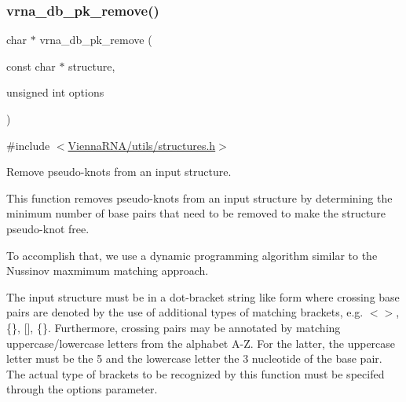 \subsubsection{\texorpdfstring{vrna\_db\_pk\_remove()}{vrna\_db\_pk\_remove()}}
{\footnotesize\ttfamily char $\ast$ vrna\+\_\+db\+\_\+pk\+\_\+remove (\begin{DoxyParamCaption}\item[{const char $\ast$}]{structure,  }\item[{unsigned int}]{options }\end{DoxyParamCaption})}



{\ttfamily \#include $<$\mbox{\hyperlink{utils_2structures_8h}{Vienna\+R\+N\+A/utils/structures.\+h}}$>$}



Remove pseudo-\/knots from an input structure. 

This function removes pseudo-\/knots from an input structure by determining the minimum number of base pairs that need to be removed to make the structure pseudo-\/knot free.

To accomplish that, we use a dynamic programming algorithm similar to the Nussinov maxmimum matching approach.

The input structure must be in a dot-\/bracket string like form where crossing base pairs are denoted by the use of additional types of matching brackets, e.\+g. {\ttfamily $<$$>$}, {\ttfamily \{\}}, {\ttfamily }\mbox{[}\mbox{]}, {\ttfamily \{\}}. Furthermore, crossing pairs may be annotated by matching uppercase/lowercase letters from the alphabet {\ttfamily A-\/Z}. For the latter, the uppercase letter must be the 5\textquotesingle{} and the lowercase letter the 3\textquotesingle{} nucleotide of the base pair. The actual type of brackets to be recognized by this function must be specifed through the {\ttfamily options} parameter.

